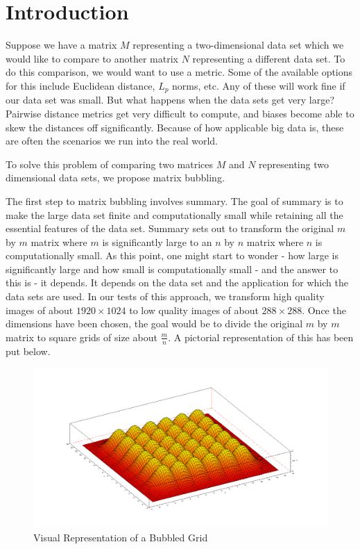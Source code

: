 \documentclass{article}
\begin{document}
\section{Introduction}

Suppose we have a matrix $M$ representing a two-dimensional data set which we would like to compare to another matrix $N$ representing a different data set. To do this comparison, we would want to use a metric. Some of the available options for this include Euclidean distance, $L_p$ norms, etc. Any of these will work fine if our data set was small. But what happens when the data sets get very large? Pairwise distance metrics get very difficult to compute, and biases become able to skew the distances off significantly. Because of how applicable big data is, these are often the scenarios we run into the real world.

To solve this problem of comparing two matrices $M$ and $N$ representing two dimensional data sets, we propose matrix bubbling.\cite{gu}

The first step to matrix bubbling involves summary. The goal of summary is to make the large data set finite and computationally small while retaining all the essential features of the data set. Summary sets out to transform the original $m$ by $m$ matrix where $m$ is significantly large to an $n$ by $n$ matrix where $n$ is computationally small. As this point, one might start to wonder - how large is significantly large and how small is computationally small - and the answer to this is - it depends. It depends on the data set and the application for which the data sets are used. In our tests of this approach, we transform high quality images of about $1920 \times 1024$ to low quality images of about $288 \times 288$. Once the dimensions have been chosen, the goal would be to divide the original $m$ by $m$ matrix to square grids of size about $\frac{m}{n}$. A pictorial representation of this has been put below.

\begin{figure}[h!]
\begin{center}
\includegraphics[scale=0.16]{matrixbubblesample.png}
\caption{Visual Representation of a Bubbled Grid\cite{bubble}}
\end{center}
\end{figure}
\end{document}
